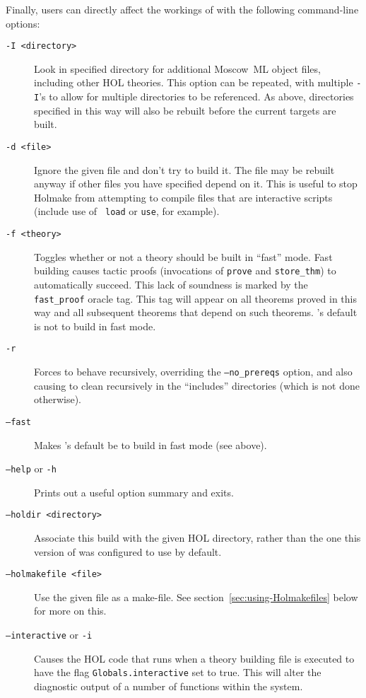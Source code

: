 \noindent Finally, users can directly affect the workings of \holmake{}
with the following command-line options:
\begin{description}
\item[\tt -I <directory>] Look in specified directory for additional
  Moscow~ML object files, including other HOL theories.  This option
  can be repeated, with multiple {\tt -I}'s to allow for multiple
  directories to be referenced.  As above, directories specified in
  this way will also be rebuilt before the current targets are built.
\item[\tt -d <file>] Ignore the given file and don't try to build it.
  The file may be rebuilt anyway if other files you have specified
  depend on it.  This is useful to stop Holmake from attempting to
  compile files that are interactive scripts (include use of {\tt
  load} or {\tt use}, for example).
\item[\texttt{-f <theory>}] Toggles whether or not a theory should be
  built in ``fast'' mode.  Fast building causes tactic proofs
  (invocations of \texttt{prove} and \texttt{store\_thm}) to
  automatically succeed.  This lack of soundness is marked by the
  \texttt{fast\_proof} oracle tag.  This tag will appear on all
  theorems proved in this way and all subsequent theorems that depend
  on such theorems.  \holmake's default is not to build in fast mode.
\item[\texttt{-r}]%
%
Forces \holmake{} to behave recursively, overriding the \texttt{--no\_prereqs} option, and also causing \holmake{} to clean recursively in the ``includes'' directories (which is not done otherwise).
\item[\texttt{--fast}] Makes \holmake's default be to build in fast
  mode (see above).
\item[{\tt --help} or {\tt -h}] Prints out a useful option summary and
  exits.
\item[\tt --holdir <directory>] Associate this build with the given
  HOL directory, rather than the one this version of \holmake{} was
  configured to use by default.
\item[\tt --holmakefile <file>] Use the given file as a make-file.
  See section~\ref{sec:using-Holmakefiles} below for more on this.
\item[\texttt{--interactive} or \texttt{-i}] Causes the HOL code that
  runs when a theory building file is executed to have the flag
  \texttt{Globals.interactive} set to true.  This will alter the diagnostic
  output of a number of functions within the system.

\end{description}
